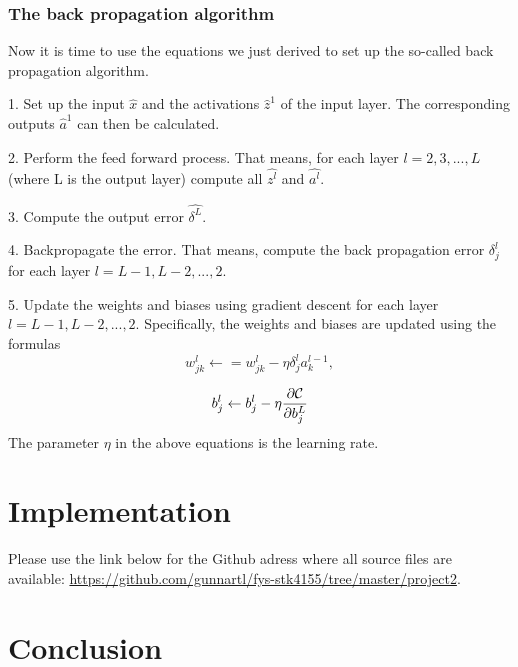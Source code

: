 \documentclass[a4paper,12pt]{article}
\begin{document}
\subsubsection{The back propagation algorithm}
Now it is time to use the equations we just derived to set up the so-called back propagation algorithm.\newline

1. Set up the input $\hat{x}$ and the activations $\hat{z}^1$ of the input layer. The corresponding outputs $\hat{a}^1$ can then be calculated.\newline 

2. Perform the feed forward process. That means, for each layer $l = 2, 3,..., L$ (where L is the output layer) compute all $\hat{z^l}$ and $\hat{a^l}$.\newline

3. Compute the output error $\hat{\delta^L}$.\newline

4. Backpropagate the error. That means, compute the back propagation error $\delta_j^l$ for each layer $l = L-1, L-2,..., 2$.\newline

5. Update the weights and biases using gradient descent for each layer $l=L-1, L-2,..., 2$. Specifically, the weights and biases are updated using the formulas
\begin{equation}
    w_{jk}^l\leftarrow  = w_{jk}^l- \eta \delta_j^la_k^{l-1},
\end{equation}

\begin{equation}
    b_j^l \leftarrow b_j^l-\eta \frac{\partial {\cal C}}{\partial b_j^L}
\end{equation}
The parameter $\eta$ in the above equations is the learning rate.

\section{Implementation}
Please use the link below for the Github adress where all source files are available:\newline
\href{https://github.com/gunnartl/fys-stk4155/tree/master/project2}{https://github.com/gunnartl/fys-stk4155/tree/master/project2}.

\section{Conclusion}
\end{document}
